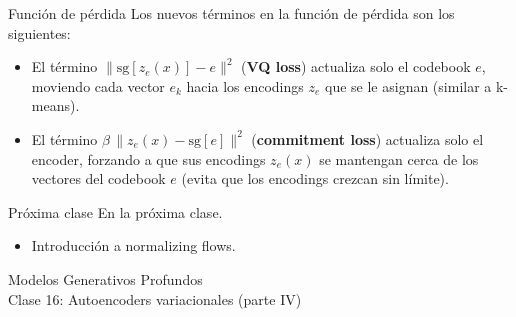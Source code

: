 \documentclass{beamer}
\begin{document}
\begin{frame}{Función de pérdida}
    Los nuevos términos en la función de pérdida son los siguientes:
    \vspace{-0.5cm}
    \begin{itemize}
        \item El término $\|\text{sg}[z_e(x)] - e\|^2$ (\textbf{VQ loss}) actualiza solo el codebook $e$, moviendo cada vector $e_k$ hacia los encodings $z_e$ que se le asignan (similar a k-means).
        \item El término $\beta\,\|z_e(x) - \text{sg}[e]\|^2$ (\textbf{commitment loss}) actualiza solo el encoder, forzando a que sus encodings $z_e(x)$ se mantengan cerca de los vectores del codebook $e$ (evita que los encodings crezcan sin límite).
    \end{itemize}
\end{frame}

\begin{frame}{Próxima clase}
    En la próxima clase.
    \begin{itemize}
        \item Introducción a normalizing flows.
    \end{itemize}
\end{frame}

\begin{frame}
    \centering
    \Large{Modelos Generativos Profundos}\\
    \large{Clase 16: Autoencoders variacionales (parte IV)}
\end{frame}
\end{document}
